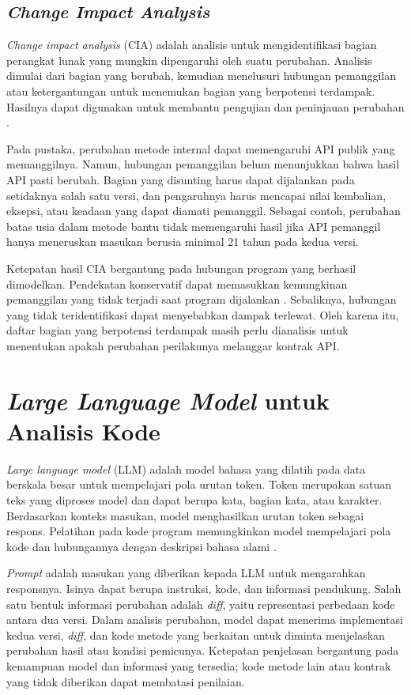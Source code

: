 \subsection{\textit{Change Impact Analysis}}

\textit{Change impact analysis} (CIA) adalah analisis untuk mengidentifikasi bagian perangkat lunak yang mungkin dipengaruhi oleh suatu perubahan. Analisis dimulai dari bagian yang berubah, kemudian menelusuri hubungan pemanggilan atau ketergantungan untuk menemukan bagian yang berpotensi terdampak. Hasilnya dapat digunakan untuk membantu pengujian dan peninjauan perubahan \parencite{RyderTip2001}.

Pada pustaka, perubahan metode internal dapat memengaruhi API publik yang memanggilnya. Namun, hubungan pemanggilan belum menunjukkan bahwa hasil API pasti berubah. Bagian yang disunting harus dapat dijalankan pada setidaknya salah satu versi, dan pengaruhnya harus mencapai nilai kembalian, eksepsi, atau keadaan yang dapat diamati pemanggil. Sebagai contoh, perubahan batas usia dalam metode bantu tidak memengaruhi hasil jika API pemanggil hanya meneruskan masukan berusia minimal 21 tahun pada kedua versi.

Ketepatan hasil CIA bergantung pada hubungan program yang berhasil dimodelkan. Pendekatan konservatif dapat memasukkan kemungkinan pemanggilan yang tidak terjadi saat program dijalankan \parencite{GroveChambers2001}. Sebaliknya, hubungan yang tidak teridentifikasi dapat menyebabkan dampak terlewat. Oleh karena itu, daftar bagian yang berpotensi terdampak masih perlu dianalisis untuk menentukan apakah perubahan perilakunya melanggar kontrak API\@.

\section{\textit{Large Language Model} untuk Analisis Kode}
\label{sec:llm}

\textit{Large language model} (LLM) adalah model bahasa yang dilatih pada data berskala besar untuk mempelajari pola urutan token. Token merupakan satuan teks yang diproses model dan dapat berupa kata, bagian kata, atau karakter. Berdasarkan konteks masukan, model menghasilkan urutan token sebagai respons. Pelatihan pada kode program memungkinkan model mempelajari pola kode dan hubungannya dengan deskripsi bahasa alami \parencite{Chen2021Code}.

\textit{Prompt} adalah masukan yang diberikan kepada LLM untuk mengarahkan responsnya. Isinya dapat berupa instruksi, kode, dan informasi pendukung. Salah satu bentuk informasi perubahan adalah \textit{diff}, yaitu representasi perbedaan kode antara dua versi. Dalam analisis perubahan, model dapat menerima implementasi kedua versi, \textit{diff}, dan kode metode yang berkaitan untuk diminta menjelaskan perubahan hasil atau kondisi pemicunya. Ketepatan penjelasan bergantung pada kemampuan model dan informasi yang tersedia; kode metode lain atau kontrak yang tidak diberikan dapat membatasi penilaian.

